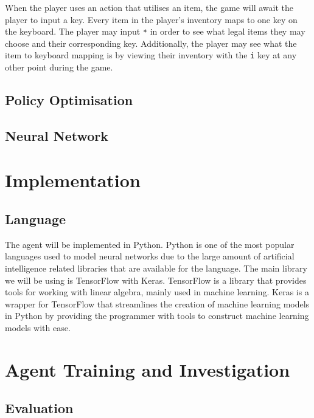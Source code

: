 \documentclass[12pt,a4paper]{article}
\begin{document}
    When the player uses an action that utilises an item, the game will await the player to input a key.
    Every item in the player's inventory maps to one key on the keyboard.
    The player may input \texttt{*} in order to see what legal items they may choose and their corresponding key.
    Additionally, the player may see what the item to keyboard mapping is by viewing their inventory with the \texttt{i} key at any other point during the game.

    \subsection{Policy Optimisation}\label{subsec:policy-optimisation}

    \subsection{Neural Network}\label{subsec:neural-network}




    \section{Implementation}\label{sec:implementation}

    \subsection{Language}\label{subsec:language}

    The agent will be implemented in Python.
    Python is one of the most popular languages used to model neural networks due to the large amount of artificial intelligence related libraries that are available for the language.
    The main library we will be using is TensorFlow with Keras.
    TensorFlow is a library that provides tools for working with linear algebra, mainly used in machine learning.
    Keras is a wrapper for TensorFlow that streamlines the creation of machine learning models in Python by providing the programmer with tools to construct machine learning models with ease.


    \section{Agent Training and Investigation}\label{sec:agent-training-and-investigation}

    \subsection{Evaluation}\label{subsec:evaluation}
\end{document}
